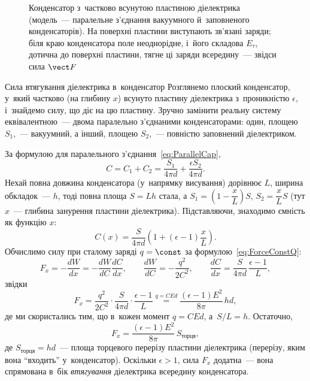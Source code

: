 \begin{figure}[tbp]\centering
	\caption{Конденсатор з~частково всунутою пластиною діелектрика (модель~--- паралельне
		з'єднання вакуумного й~заповненого конденсаторів). На поверхні пластини виступають
		зв'язані заряди; біля краю конденсатора поле неоднорідне, і~його складова $E_\tau$,
		дотична до поверхні пластини, тягне ці заряди всередину~--- звідси сила
		$\vect F$\label{pic:DielectricInCapacitor}}
\end{figure}

\begin{Example}{Сила втягування діелектрика в~конденсатор}
Розглянемо плоский конденсатор, у~який частково (на глибину $x$) всунуто пластину
діелектрика з~проникністю $\epsilon$, і~знайдемо силу, що діє на цю пластину. Зручно
замінити реальну систему еквівалентною~--- двома паралельно з'єднаними конденсаторами:
один, площею $S_1$,~--- вакуумний, а інший, площею $S_2$,~--- повністю заповнений
діелектриком.

За формулою для паралельного з'єднання~\eqref{eq:ParallelCap},
\begin{equation*}
	C = C_1 + C_2 = \frac{S_1}{4\pi d} + \frac{\epsilon S_2}{4\pi d}.
\end{equation*}
Нехай повна довжина конденсатора (у~напрямку висування) дорівнює $L$, ширина обкладок~---
$h$, тоді повна площа $S = Lh$ стала, а $S_1 = \left(1 - \dfrac{x}{L}\right) S$, $S_2 =
\dfrac{x}{L}S$ (тут $x$~--- глибина занурення пластини діелектрика). Підставляючи,
знаходимо ємність як функцію $x$:
\begin{equation*}
	C(x) = \frac{S}{4\pi d}\left(1 + (\epsilon - 1)\frac{x}{L}\right).
\end{equation*}
Обчислимо силу при сталому заряді $q = \const$ за формулою~\eqref{eq:ForceConstQ}:
\begin{equation*}
	F_x = -\frac{dW}{dx} = -\frac{dW}{dC}\frac{dC}{dx}, \qquad \frac{dW}{dC} = -\frac{q^2}{2C^2}, \qquad \frac{dC}{dx} = \frac{S}{4\pi d}\,
	\frac{\epsilon-1}{L},
\end{equation*}
звідки
\begin{equation*}
	F_x = \frac{q^2}{2C^2}\cdot\frac{S}{4\pi d}\cdot\frac{\epsilon - 1}{L} \stackrel{q = CEd}{=} \frac{(\epsilon-1)E^2}{8\pi}\, hd,
\end{equation*}
де ми скористались тим, що в~кожен момент $q = CEd$, а~$S/L = h$. Остаточно,
\begin{equation}\label{eq:ForceDielectric}
		F_x = \frac{(\epsilon-1)E^2}{8\pi}\, S_\text{торця},
\end{equation}
де $S_\text{торця} = hd$~--- площа торцевого перерізу пластини діелектрика (перерізу, яким
вона \enquote{входить} у~конденсатор). Оскільки $\epsilon > 1$, сила $F_x$ додатна~---
вона спрямована в~бік \emph{втягування} діелектрика всередину конденсатора.
\end{Example}

